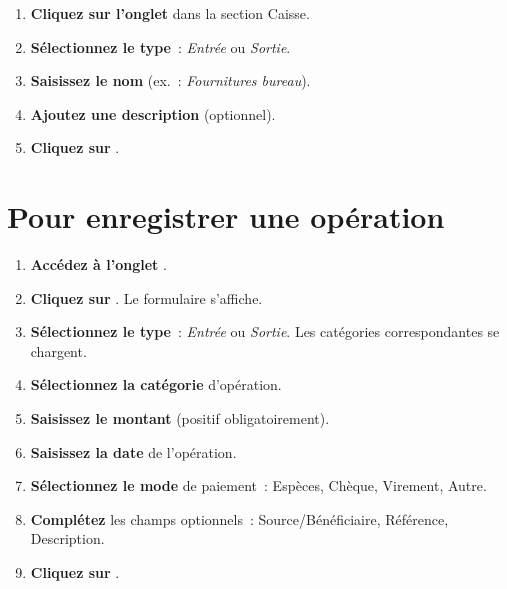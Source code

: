 \begin{etape}[title=Proc\'edure : Cr\'eer une cat\'egorie d'op\'eration]
\begin{enumerate}[leftmargin=1.5cm,label=\textbf{\arabic*.},itemsep=10pt]
  \item \textbf{Cliquez sur l'onglet}  dans la section Caisse.
  \item \textbf{S\'electionnez le type}~: \textit{Entr\'ee} ou \textit{Sortie}.
  \item \textbf{Saisissez le nom} (ex.\ : \textit{Fournitures bureau}).
  \item \textbf{Ajoutez une description} (optionnel).
  \item \textbf{Cliquez sur} .
\end{enumerate}
\end{etape}

\section{Pour enregistrer une op\'eration}

\begin{etape}[title=Proc\'edure d\'etaill\'ee : Enregistrer une op\'eration de caisse]
\begin{enumerate}[leftmargin=1.5cm,label=\textbf{\arabic*.},itemsep=12pt]
  \item \textbf{Acc\'edez \`a l'onglet} .
  \item \textbf{Cliquez sur} . Le formulaire s'affiche.
  \item \textbf{S\'electionnez le type}~: \textit{Entr\'ee} ou \textit{Sortie}. Les cat\'egories correspondantes se chargent.
  \item \textbf{S\'electionnez la cat\'egorie} d'op\'eration.
  \item \textbf{Saisissez le montant} (positif obligatoirement).
  \item \textbf{Saisissez la date} de l'op\'eration.
  \item \textbf{S\'electionnez le mode} de paiement~: Esp\`eces, Ch\`eque, Virement, Autre.
  \item \textbf{Compl\'etez} les champs optionnels~: Source/B\'en\'eficiaire, R\'ef\'erence, Description.
  \item \textbf{Cliquez sur} .
\end{enumerate}
\end{etape}

